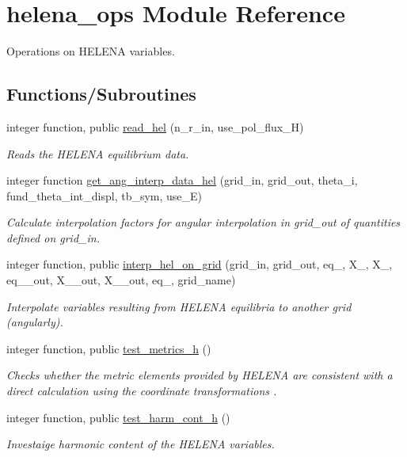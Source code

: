 \hypertarget{namespacehelena__ops}{}\section{helena\+\_\+ops Module Reference}
\label{namespacehelena__ops}


Operations on H\+E\+L\+E\+NA variables.  


\subsection*{Functions/\+Subroutines}
\begin{DoxyCompactItemize}
\item 
integer function, public \hyperlink{namespacehelena__ops_ae05ba1182eb002d93c27ca4ff7ab8cf2}{read\+\_\+hel} (n\+\_\+r\+\_\+in, use\+\_\+pol\+\_\+flux\+\_\+H)
\begin{DoxyCompactList}\small\item\em Reads the H\+E\+L\+E\+NA equilibrium data. \end{DoxyCompactList}\item 
integer function \hyperlink{namespacehelena__ops_ab1329afe5af2ff92d96f4be15a096b38}{get\+\_\+ang\+\_\+interp\+\_\+data\+\_\+hel} (grid\+\_\+in, grid\+\_\+out, theta\+\_\+i, fund\+\_\+theta\+\_\+int\+\_\+displ, tb\+\_\+sym, use\+\_\+E)
\begin{DoxyCompactList}\small\item\em Calculate interpolation factors for angular interpolation in {\ttfamily grid\+\_\+out} of quantities defined on {\ttfamily grid\+\_\+in}. \end{DoxyCompactList}\item 
integer function, public \hyperlink{namespacehelena__ops_a7796861de18ae7ac9c3aa07a8628be38}{interp\+\_\+hel\+\_\+on\+\_\+grid} (grid\+\_\+in, grid\+\_\+out, eq\+\_, X\+\_, X\+\_, eq\+\_\+\_\+out, X\+\_\+\_\+out, X\+\_\+\_\+out, eq\+\_, grid\+\_\+name)
\begin{DoxyCompactList}\small\item\em Interpolate variables resulting from H\+E\+L\+E\+NA equilibria to another grid (angularly). \end{DoxyCompactList}\item 
integer function, public \hyperlink{namespacehelena__ops_a0f156b3653264fb016d6d311eb59114c}{test\+\_\+metrics\+\_\+h} ()
\begin{DoxyCompactList}\small\item\em Checks whether the metric elements provided by H\+E\+L\+E\+NA are consistent with a direct calculation using the coordinate transformations \cite{Weyens3D}. \end{DoxyCompactList}\item 
integer function, public \hyperlink{namespacehelena__ops_a83f2ad5dc967c7bae287b60fddb8eb0a}{test\+\_\+harm\+\_\+cont\+\_\+h} ()
\begin{DoxyCompactList}\small\item\em Investaige harmonic content of the H\+E\+L\+E\+NA variables. \end{DoxyCompactList}\end{DoxyCompactItemize}


